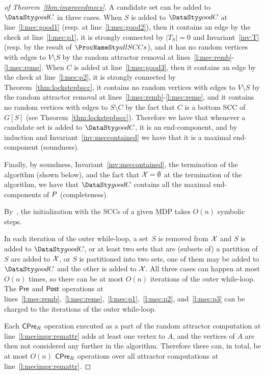 \begin{proof}[of Theorem~\ref{thm:improvedmecs}]

\smallskip{}
A candidate set can be added to $\goodC$ in three cases. When $S$ is added to $\goodC$
at line~\ref{l:mec:good1} (resp. at line~\ref{l:mec:good2}), then it contains an edge by the check at line~\ref{l:mec:p1},
it is strongly connected by $\lvert T_S \rvert = 0$ and Invariant~\ref{inv:T} (resp. by the result of $\sccalg$), and it has no
random vertices with edges to $V \setminus S$ by the random attractor removal at lines~\ref{l:mec:remb}-\ref{l:mec:reme}.
When $C$ is added at line~\ref{l:mec:good3}, then it contains an edge by the check at line~\ref{l:mec:p2},
it is strongly connected by Theorem~\ref{thm:lockstepbscc}, it contains no random vertices with edges to
$V \setminus S$ by the random attractor removal at lines~\ref{l:mec:remb}-\ref{l:mec:reme}, and it
contains no random vertices with edges to $S \setminus C$ by the fact that $C$ is a bottom SCC of $G[S]$
(see Theorem~\ref{thm:lockstepbscc}). Therefore we have that whenever a candidate set is added to $\goodC$,
it is an end-component, and by induction and Invariant~\ref{inv:meccontained} we have that
it is a maximal end-component (soundness).

Finally, by soundness, Invariant~\ref{inv:meccontained}, the termination of the algorithm
(shown below), and the fact that $\mathcal{X} = \emptyset$ at the
termination of the algorithm, we have that $\goodC$ contains all the maximal
end-components of $P$ (completeness).

\smallskip{}
By~\cite{GentiliniPP08}, the initialization with the SCCs of
a given MDP takes $O(n)$ symbolic steps.

In each iteration of the outer while-loop, a set~$S$ is removed 
from $\mathcal{X}$ and  $S$ is added to $\goodC$, or
 at least two sets that are (subsets of) a partition of $S$ are added
to $\mathcal{X}$, or  $S$ is partitioned into two sets, one
of them may be added to $\goodC$ and the other is added to $\mathcal{X}$.
All three cases can happen at most $O(n)$ times, so there can be at most
$O(n)$ iterations of the outer while-loop. The $\mathsf{Pre}$ and $\mathsf{Post}$ operations
at lines~\ref{l:mec:remb},~\ref{l:mec:reme},~\ref{l:mec:p1},~\ref{l:mec:p2},
and~\ref{l:mec:p3} can be charged to the iterations of the outer while-loop.

Each $\mathsf{CPre}_{R}$ operation executed as a part of the random attractor computation
at line~\ref{l:mecimpr:remattr} adds at least one vertex to $A$, and the vertices
of $A$ are then not considered any further in the algorithm. Therefore there
can, in total, be at most $O(n)$ $\mathsf{CPre}_{R}$ operations over all attractor computations
at line~\ref{l:mecimpr:remattr}.


\end{proof}
